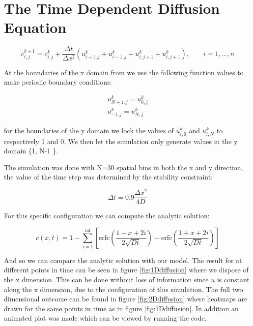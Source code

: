 \documentclass[a4paper]{article}
\begin{document}



\section{The Time Dependent Diffusion Equation}

\begin{equation}
c^{k+1}_{i,j} = c^{k}_{i,j} +  \frac{\Delta t}{\Delta x^2} \left ( u^{k}_{i+1,j} +u^{k}_{i-1,j} + u^{k}_{i,j+1} + u^{k}_{i,j+1}
 \right ), \qquad i = 1, ... , n
\end{equation}

At the boundaries of the x domain from we use the following function values to make periodic boundary conditions: 

\begin{subequations}
\begin{align}
u^{k}_{N+1,j} = u^{k}_{0,j}\\
u^{k}_{-1,j} = u^{k}_{N,j} 
\end{align}
\end{subequations}

for the boundaries of the y domain we lock the values of $u^{k}_{i,0}$ and $u^{k}_{i,N}$ to respectively 1 and 0. We then let the simulation only generate values in the y domain \{1, N-1 \}.

The simulation was done with N=30 spatial bins in both the x and y direction, the value of the time step was determined by the stability constraint:

\begin{equation}
    \Delta t = 0.9 \frac{\Delta x^2}{4 D}
\end{equation}

For this specific configuration we can compute the analytic solution:

\begin{equation}
    c(x,t) = 1 - \sum\limits_{i=1}^{\inf} \left [ \text{erfc} \left (\frac{1 - x + 2i}{2 \sqrt{D t}} \right ) - \text{erfc} \left (\frac{1 + x + 2i}{2 \sqrt{D t}} \right ) \right]
\end{equation}

And so we can compare the analytic solution with our model. The result for at different points in time can be seen in figure \ref{fig:1Ddiffusion} where we dispose of the x dimension. This can be done without loss of information since $u$ is constant along the x dimension, due to the configuration of this simulation. The full two dimensional outcome can be found in figure \ref{fig:2Ddiffusion} where heatmaps are drawn for the same points in time as in figure \ref{fig:1Ddiffusion}. In addition an animated plot was made which can be viewed by running the code. 
\end{document}
